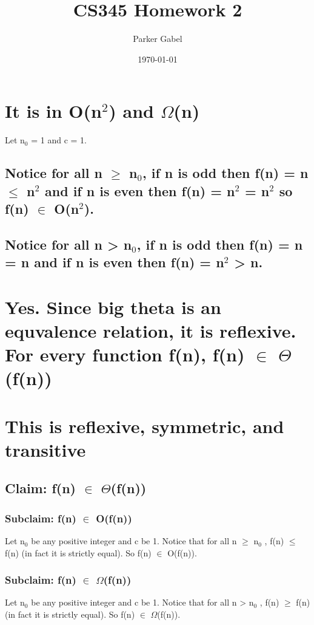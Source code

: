 \documentclass[11pt]{article}
\author{Parker Gabel}
\date{\today}
\title{CS345 Homework 2}
\begin{document}
\maketitle
\section{It is in O(n\(^{\text{2}}\)) and \(\Omega\)(n)}
\label{sec:org12f3586}
Let n\(_{\text{0}}\) = 1 and c = 1. 
\subsection{Notice for all n \(\ge\) n\(_{\text{0}}\), if n is odd then f(n) = n \(\le\) n\(^{\text{2}}\) and if n is even then f(n) = n\(^{\text{2}}\) = n\(^{\text{2}}\) so f(n) \(\in\) O(n\(^{\text{2}}\)).}
\label{sec:org226af0c}
\subsection{Notice for all n \textgreater{} n\(_{\text{0}}\), if n is odd then f(n) = n = n and if n is even then f(n) = n\(^{\text{2}}\) \textgreater{} n.}
\label{sec:org3e83882}
\section{Yes. Since big theta is an equvalence relation, it is reflexive. For every function f(n), f(n) \(\in\) \(\Theta\)(f(n))}
\label{sec:orgd9c8c44}
\section{This is reflexive, symmetric, and transitive}
\label{sec:org41c4520}
\subsection{Claim: f(n) \(\in\) \(\Theta\)(f(n))}
\label{sec:org8438db7}
\subsubsection{Subclaim: f(n) \(\in\) O(f(n))}
\label{sec:org74ab111}
Let n\(_{\text{0}}\) be any positive integer and c be 1. Notice that for all n \(\ge\) n\(_{\text{0}}\) , f(n) \(\le\) f(n) (in fact it is strictly equal). So f(n) \(\in\) O(f(n)).
\subsubsection{Subclaim: f(n) \(\in\) \(\Omega\)(f(n))}
\label{sec:orgead8068}
Let n\(_{\text{0}}\) be any positive integer and c be 1. Notice that for all n \textgreater{} n\(_{\text{0}}\) , f(n) \(\ge\) f(n) (in fact it is strictly equal). So f(n) \(\in\) \(\Omega\)(f(n)).
\end{document}
